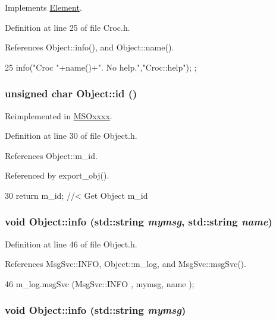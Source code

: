 Implements \hyperlink{classElement_a32c0de27acb08e17251cef88c3e9303a}{Element}.

Definition at line 25 of file Croc.h.

References Object::info(), and Object::name().


\begin{DoxyCode}
25 { info("Croc "+name()+". No help.","Croc::help"); };
\end{DoxyCode}
\hypertarget{classObject_af99145335cc61ff6e2798ea17db009d2}{
\subsubsection[{id}]{\setlength{\rightskip}{0pt plus 5cm}unsigned char Object::id ()}}
\label{classObject_af99145335cc61ff6e2798ea17db009d2}


Reimplemented in \hyperlink{classMSOxxxx_a0f14b23d31d8e7647184e99a89600cc3}{MSOxxxx}.

Definition at line 30 of file Object.h.

References Object::m\_\-id.

Referenced by export\_\-obj().


\begin{DoxyCode}
30 { return m_id;         } //< Get Object m_id 
\end{DoxyCode}
\hypertarget{classObject_a1ca123253dfd30fc28b156f521dcbdae}{
\subsubsection[{info}]{\setlength{\rightskip}{0pt plus 5cm}void Object::info (std::string {\em mymsg}, \/  std::string {\em name})}}
\label{classObject_a1ca123253dfd30fc28b156f521dcbdae}


Definition at line 46 of file Object.h.

References MsgSvc::INFO, Object::m\_\-log, and MsgSvc::msgSvc().


\begin{DoxyCode}
46 { m_log.msgSvc (MsgSvc::INFO    , mymsg, name ); }
\end{DoxyCode}
\hypertarget{classObject_a644fd329ea4cb85f54fa6846484b84a8}{
\subsubsection[{info}]{\setlength{\rightskip}{0pt plus 5cm}void Object::info (std::string {\em mymsg})}}
\label{classObject_a644fd329ea4cb85f54fa6846484b84a8}


